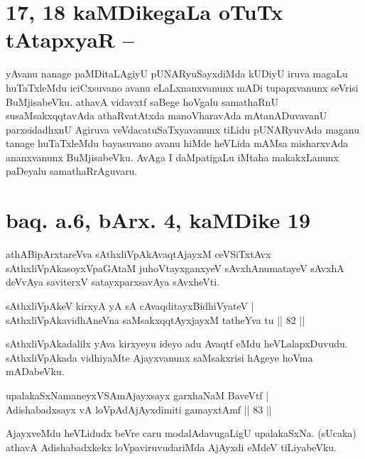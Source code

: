 \section*{17, 18 kaMDikegaLa oTuTx tAtapxyaR --}

\begin{artha}
yAvanu nanage paMDitaLAgiyU pUNARyuSayxdiMda kUDiyU iruva magaLu 
huTaTxleMdu iciCxsuvano avanu eLaLxnanxvanunx mADi tupapxvanunx 
seVrisi BuMjisabeVku. athavA vidavxtf saBege hoVgalu samathaRnU 
susaMsakxqqtavAda athaRvatAtxda manoVharavAda mAtanADuvavanU 
parxsidadhxnU Agiruva veVdacatuSaTxyavanunx tiLidu pUNARyuvAda maganu 
tanage huTaTxleMdu bayasuvano avanu hiMde heVLida mAMsa misharxvAda 
ananxvanunx BuMjisabeVku. AvAga I daMpatigaLu iMtaha makakxLanunx 
paDeyalu samathaRrAguvaru.
\end{artha}

\section*{baq. a.6, bArx. 4, kaMDike 19}

\begin{shl}
athABipArxtareVva sAthxliVpAkAvaqtAjayxM ceVSiTxtAvx sAthxliVpAkasoyxVpaGAtaM juhoVtayxganxyeV sAvxhAnumatayeV sAvxhA deVvAya saviterxV satayxparxsavAya sAvxheVti.
\end{shl}


\begin{shl}
sAthxliVpAkeV kirxyA yA sA cA\s \s vaqditayxBidhiVyateV | \\
sAthxliVpAkavidhAneVna saMsakxqqtAyx\s \s jayxM tatheYva tu \hfill|| 82 || 
\end{shl}

\begin{artha}
sAthxliVpAkadalilx yAva kirxyeyu ideyo adu Avaqtf eMdu 
heVLalapxDuvudu. sAthxliVpAkada vidhiyaMte Ajayxvanunx saMsakxrisi 
hAgeye hoVma mADabeVku.
\end{artha}

\begin{shl}
upalakaSxNamaneyxVSAmAjayxsayx garxhaNaM BaveVtf | \\
Adishabadxsayx vA loVpAdAjAyxdimiti gamayxtAmf \hfill|| 83 || 
\end{shl}

\begin{artha}
AjayxveMdu heVLidudx beVre caru modalAdavugaLigU upalakaSxNa. (sUcaka) 
athavA Adishabadxkekx loVpaviruvudariMda AjAyxdi eMdeV tiLiyabeVku.
\end{artha}

